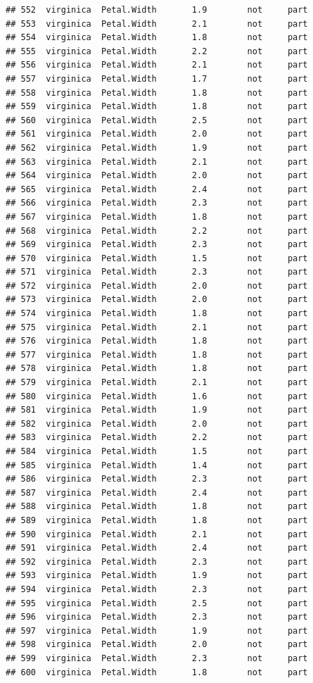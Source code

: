\documentclass[krantz2]{krantz}\usepackage{knitr}%
\begin{document}
\begin{knitrout}
\begin{kframe}
\begin{verbatim}
## 552  virginica  Petal.Width       1.9        not     part
## 553  virginica  Petal.Width       2.1        not     part
## 554  virginica  Petal.Width       1.8        not     part
## 555  virginica  Petal.Width       2.2        not     part
## 556  virginica  Petal.Width       2.1        not     part
## 557  virginica  Petal.Width       1.7        not     part
## 558  virginica  Petal.Width       1.8        not     part
## 559  virginica  Petal.Width       1.8        not     part
## 560  virginica  Petal.Width       2.5        not     part
## 561  virginica  Petal.Width       2.0        not     part
## 562  virginica  Petal.Width       1.9        not     part
## 563  virginica  Petal.Width       2.1        not     part
## 564  virginica  Petal.Width       2.0        not     part
## 565  virginica  Petal.Width       2.4        not     part
## 566  virginica  Petal.Width       2.3        not     part
## 567  virginica  Petal.Width       1.8        not     part
## 568  virginica  Petal.Width       2.2        not     part
## 569  virginica  Petal.Width       2.3        not     part
## 570  virginica  Petal.Width       1.5        not     part
## 571  virginica  Petal.Width       2.3        not     part
## 572  virginica  Petal.Width       2.0        not     part
## 573  virginica  Petal.Width       2.0        not     part
## 574  virginica  Petal.Width       1.8        not     part
## 575  virginica  Petal.Width       2.1        not     part
## 576  virginica  Petal.Width       1.8        not     part
## 577  virginica  Petal.Width       1.8        not     part
## 578  virginica  Petal.Width       1.8        not     part
## 579  virginica  Petal.Width       2.1        not     part
## 580  virginica  Petal.Width       1.6        not     part
## 581  virginica  Petal.Width       1.9        not     part
## 582  virginica  Petal.Width       2.0        not     part
## 583  virginica  Petal.Width       2.2        not     part
## 584  virginica  Petal.Width       1.5        not     part
## 585  virginica  Petal.Width       1.4        not     part
## 586  virginica  Petal.Width       2.3        not     part
## 587  virginica  Petal.Width       2.4        not     part
## 588  virginica  Petal.Width       1.8        not     part
## 589  virginica  Petal.Width       1.8        not     part
## 590  virginica  Petal.Width       2.1        not     part
## 591  virginica  Petal.Width       2.4        not     part
## 592  virginica  Petal.Width       2.3        not     part
## 593  virginica  Petal.Width       1.9        not     part
## 594  virginica  Petal.Width       2.3        not     part
## 595  virginica  Petal.Width       2.5        not     part
## 596  virginica  Petal.Width       2.3        not     part
## 597  virginica  Petal.Width       1.9        not     part
## 598  virginica  Petal.Width       2.0        not     part
## 599  virginica  Petal.Width       2.3        not     part
## 600  virginica  Petal.Width       1.8        not     part
\end{verbatim}
\end{kframe}
\end{knitrout}
\end{document}
